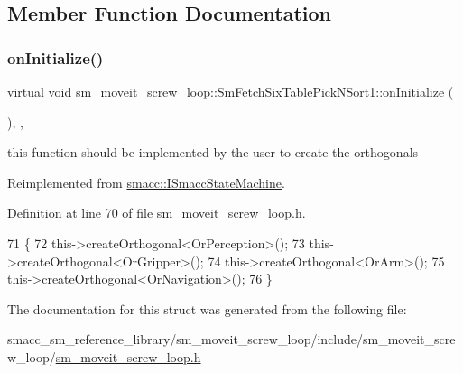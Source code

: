 \subsection{Member Function Documentation}
\mbox{\label{structsm__moveit__screw__loop_1_1SmFetchSixTablePickNSort1_a1d6d736d4261244a85c293b53ccce2c4}} 
\subsubsection{\texorpdfstring{on\+Initialize()}{onInitialize()}}
{\footnotesize\ttfamily virtual void sm\+\_\+moveit\+\_\+screw\+\_\+loop\+::\+Sm\+Fetch\+Six\+Table\+Pick\+N\+Sort1\+::on\+Initialize (\begin{DoxyParamCaption}{ }\end{DoxyParamCaption})\hspace{0.3cm}{\ttfamily [inline]}, {\ttfamily [override]}, {\ttfamily [virtual]}}



this function should be implemented by the user to create the orthogonals 



Reimplemented from \hyperlink{classsmacc_1_1ISmaccStateMachine_ac2982c6c8283663e5e1e8a7c82f511ec}{smacc\+::\+I\+Smacc\+State\+Machine}.



Definition at line 70 of file sm\+\_\+moveit\+\_\+screw\+\_\+loop.\+h.


\begin{DoxyCode}
71         \{
72             this->createOrthogonal<OrPerception>();
73             this->createOrthogonal<OrGripper>();
74             this->createOrthogonal<OrArm>();
75             this->createOrthogonal<OrNavigation>();
76         \}
\end{DoxyCode}


The documentation for this struct was generated from the following file\+:\begin{DoxyCompactItemize}
\item 
smacc\+\_\+sm\+\_\+reference\+\_\+library/sm\+\_\+moveit\+\_\+screw\+\_\+loop/include/sm\+\_\+moveit\+\_\+screw\+\_\+loop/\hyperlink{sm__moveit__screw__loop_8h}{sm\+\_\+moveit\+\_\+screw\+\_\+loop.\+h}\end{DoxyCompactItemize}
